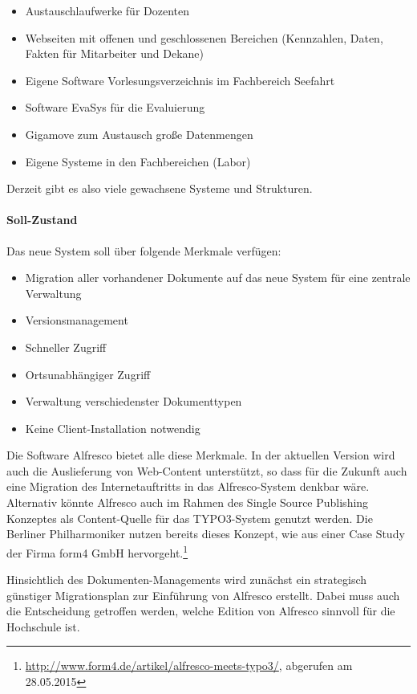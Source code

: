 \begin{itemize}
	\item Austauschlaufwerke für Dozenten
	\item Webseiten mit offenen und geschlossenen Bereichen (Kennzahlen, Daten, Fakten für Mitarbeiter und Dekane)
	\item Eigene Software Vorlesungsverzeichnis im Fachbereich Seefahrt
	\item Software EvaSys für die Evaluierung
	\item Gigamove zum Austausch große Datenmengen
	\item Eigene Systeme in den Fachbereichen (Labor)	
\end{itemize}

Derzeit gibt es also viele gewachsene Systeme und Strukturen.

\paragraph{Soll-Zustand}
Das neue System soll über folgende Merkmale verfügen:
\begin{itemize}
	\item Migration aller vorhandener Dokumente auf das neue System für eine zentrale Verwaltung
	\item Versionsmanagement
	\item Schneller Zugriff
	\item Ortsunabhängiger Zugriff
	\item Verwaltung verschiedenster Dokumenttypen
	\item Keine Client-Installation notwendig
\end{itemize}

Die Software Alfresco bietet alle diese Merkmale. In der aktuellen Version wird auch die Auslieferung von Web-Content unterstützt, so dass für die Zukunft auch eine Migration des Internetauftritts in das Alfresco-System denkbar wäre. Alternativ könnte Alfresco auch im Rahmen des Single Source Publishing Konzeptes als Content-Quelle für das TYPO3-System genutzt werden. Die Berliner Philharmoniker nutzen bereits dieses Konzept, wie aus einer Case Study der Firma form4 GmbH hervorgeht.\footnote{\url{http://www.form4.de/artikel/alfresco-meets-typo3/}, abgerufen am 28.05.2015}

Hinsichtlich des Dokumenten-Managements wird zunächst ein strategisch günstiger Migrationsplan zur Einführung von Alfresco erstellt. Dabei muss auch die Entscheidung getroffen werden, welche Edition von Alfresco sinnvoll für die Hochschule ist.

